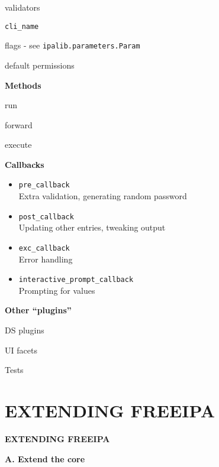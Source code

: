 \documentclass[20pt]{beamer}
\begin{document}
\begin{center}
\begin{frame}[fragile]
    validators

    \verb+cli_name+

    flags - see \verb+ipalib.parameters.Param+

    default permissions
\end{frame}

\begin{frame}[fragile]
    \textbf{Methods}
    \bigskip\bigskip

    run

    forward

    execute
\end{frame}

\begin{frame}[fragile]
    \textbf{Callbacks}
    \bigskip\bigskip

    \tiny
    \begin{itemize}
    \item[]
    \verb+pre_callback+\\
    Extra validation, generating random password

    \item[]
    \verb+post_callback+\\
    Updating other entries, tweaking output

    \item[]
    \verb+exc_callback+\\
    Error handling

    \item[]
    \verb+interactive_prompt_callback+\\
    Prompting for values
    \end{itemize}
\end{frame}

\begin{frame}[fragile]
    \textbf{\phantom{”}Other “plugins”}
    \bigskip\bigskip

    DS plugins

    UI facets

    Tests
\end{frame}

\section{EXTENDING FREEIPA}
\begin{frame}[fragile]
    \textbf{EXTENDING FREEIPA}
\end{frame}

\begin{frame}[fragile]
    \textbf{A. Extend the core}


\end{frame}
\end{center}
\end{document}
